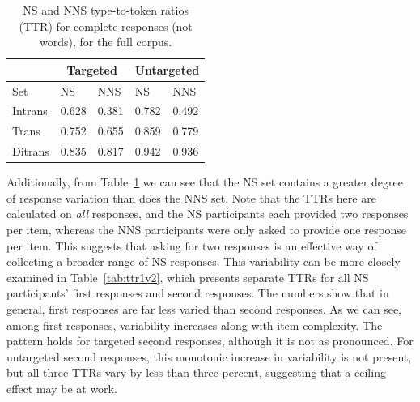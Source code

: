 \begin{table}[h!]
\begin{center}
\begin{tabular}{|l||l|l||l|l|}
\hline
 & \multicolumn{2}{|c||}{Targeted} & \multicolumn{2}{|c|}{Untargeted} \\
\hline
 Set & NS & NNS & NS & NNS \\
\hline
\hline
Intrans & 0.628 & 0.381 & 0.782 & 0.492 \\
\hline
Trans & 0.752 & 0.655 & 0.859 & 0.779 \\ %
\hline
Ditrans & 0.835 & 0.817 & 0.942 & 0.936 \\ 
\hline
\end{tabular}
\caption{\label{tab:ttr} NS and NNS type-to-token ratios (TTR) for complete responses (not words), for the full corpus.}
\end{center}
\end{table}

Additionally, from Table~\ref{tab:ttr} we can see that the NS set contains a greater degree of response variation than does the NNS set. Note that the TTRs here are calculated on \textit{all} responses, and the NS participants each provided two responses per item, whereas the NNS participants were only asked to provide one response per item. This suggests that asking for two responses is an effective way of collecting a broader range of NS responses. This variability can be more closely examined in Table~\ref{tab:ttr1v2}, which presents separate TTRs for all NS participants' first responses and second responses. The numbers show that in general, first responses are far less varied than second responses. As we can see, among first responses, variability increases along with item complexity. The pattern holds for targeted second responses, although it is not as pronounced. For untargeted second responses, this monotonic increase in variability is not present, but all three TTRs vary by less than three percent, suggesting that a ceiling effect may be at work. 

